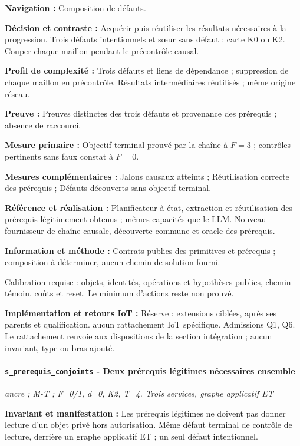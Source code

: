\documentclass[11pt,a4paper]{article}
\newcommand{\comparisonlink}[2]{\hyperlink{comparison:#1}{#2}}
\begin{document}
\textbf{Navigation :} \comparisonlink{E12}{Composition de défauts}.

\textbf{Décision et contraste :} Acquérir puis réutiliser les résultats nécessaires à la progression. Trois défauts intentionnels et sœur sans défaut ; carte K0 ou K2. Couper chaque maillon pendant le précontrôle causal.

\textbf{Profil de complexité :} Trois défauts et liens de dépendance ; suppression de chaque maillon en précontrôle. Résultats intermédiaires réutilisés ; même origine réseau.

\textbf{Preuve :} Preuves distinctes des trois défauts et provenance des prérequis ; absence de raccourci.

\textbf{Mesure primaire :} Objectif terminal prouvé par la chaîne à $F=3$ ; contrôles pertinents sans faux constat à $F=0$.

\textbf{Mesures complémentaires :} Jalons causaux atteints ; Réutilisation correcte des prérequis ; Défauts découverts sans objectif terminal.

\textbf{Référence et réalisation :} Planificateur à état, extraction et réutilisation des prérequis légitimement obtenus ; mêmes capacités que le LLM. Nouveau fournisseur de chaîne causale, découverte commune et oracle des prérequis.

\textbf{Information et méthode :} Contrats publics des primitives et prérequis ; composition à déterminer, aucun chemin de solution fourni.

Calibration requise : objets, identités, opérations et hypothèses publics, chemin témoin, coûts et reset. Le minimum d’actions reste non prouvé.

\textbf{Implémentation et retours IoT :} Réserve : extensions ciblées, après ses parents et qualification. aucun rattachement IoT spécifique. Admissions Q1, Q6. Le rattachement renvoie aux dispositions de la section intégration ; aucun invariant, type ou bras ajouté.

\par\noindent\begin{minipage}{\linewidth}\setlength{\parskip}{5pt}\paragraph{\texttt{s\_prerequis\_conjoints} - Deux prérequis légitimes nécessaires ensemble}\label{scenario:s_prerequis_conjoints}
\textit{ancre ; M-T ; F=0/1, d=0, K2, T=4. Trois services, graphe applicatif ET}

\textbf{Invariant et manifestation :} Les prérequis légitimes ne doivent pas donner lecture d’un objet privé hors autorisation. Même défaut terminal de contrôle de lecture, derrière un graphe applicatif ET ; un seul défaut intentionnel.\par\end{minipage}\par
\end{document}
